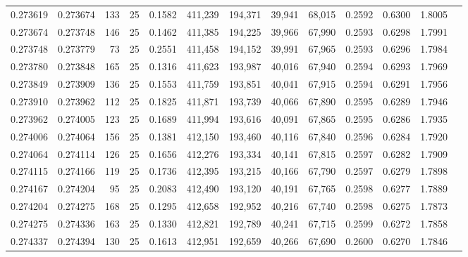 \begin{tabular}{rrrrrrrrrrrrr}
0.273619 & 0.273674 &   133 &  25 &                                     0.1582 & 411,239 & 194,371 &  39,941 &  68,015 & 0.2592 & 0.6300 & 1.8005 \\
0.273674 & 0.273748 &   146 &  25 &                                     0.1462 & 411,385 & 194,225 &  39,966 &  67,990 & 0.2593 & 0.6298 & 1.7991 \\
0.273748 & 0.273779 &    73 &  25 &                                     0.2551 & 411,458 & 194,152 &  39,991 &  67,965 & 0.2593 & 0.6296 & 1.7984 \\
0.273780 & 0.273848 &   165 &  25 &                                     0.1316 & 411,623 & 193,987 &  40,016 &  67,940 & 0.2594 & 0.6293 & 1.7969 \\
0.273849 & 0.273909 &   136 &  25 &                                     0.1553 & 411,759 & 193,851 &  40,041 &  67,915 & 0.2594 & 0.6291 & 1.7956 \\
0.273910 & 0.273962 &   112 &  25 &                                     0.1825 & 411,871 & 193,739 &  40,066 &  67,890 & 0.2595 & 0.6289 & 1.7946 \\
0.273962 & 0.274005 &   123 &  25 &                                     0.1689 & 411,994 & 193,616 &  40,091 &  67,865 & 0.2595 & 0.6286 & 1.7935 \\
0.274006 & 0.274064 &   156 &  25 &                                     0.1381 & 412,150 & 193,460 &  40,116 &  67,840 & 0.2596 & 0.6284 & 1.7920 \\
0.274064 & 0.274114 &   126 &  25 &                                     0.1656 & 412,276 & 193,334 &  40,141 &  67,815 & 0.2597 & 0.6282 & 1.7909 \\
0.274115 & 0.274166 &   119 &  25 &                                     0.1736 & 412,395 & 193,215 &  40,166 &  67,790 & 0.2597 & 0.6279 & 1.7898 \\
0.274167 & 0.274204 &    95 &  25 &                                     0.2083 & 412,490 & 193,120 &  40,191 &  67,765 & 0.2598 & 0.6277 & 1.7889 \\
0.274204 & 0.274275 &   168 &  25 &                                     0.1295 & 412,658 & 192,952 &  40,216 &  67,740 & 0.2598 & 0.6275 & 1.7873 \\
0.274275 & 0.274336 &   163 &  25 &                                     0.1330 & 412,821 & 192,789 &  40,241 &  67,715 & 0.2599 & 0.6272 & 1.7858 \\
0.274337 & 0.274394 &   130 &  25 &                                     0.1613 & 412,951 & 192,659 &  40,266 &  67,690 & 0.2600 & 0.6270 & 1.7846 \\

\end{tabular}
